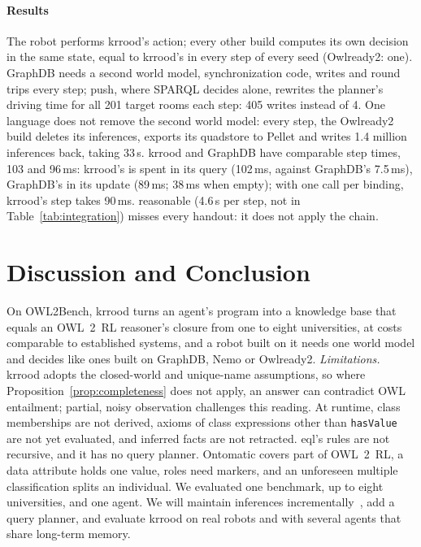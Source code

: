 \documentclass[sigconf,anonymous]{aamas}
\begin{document}
\paragraph{Results}
The robot performs \ac{krrood}'s action; every other build computes its own decision in the same state, equal to \ac{krrood}'s in every step of every seed (Owlready2: one). GraphDB needs a second world model, synchronization code, writes and round trips every step; push, where SPARQL decides alone, rewrites the planner's driving time for all 201 target rooms each step: 405 writes instead of 4. One language does not remove the second world model: every step, the Owlready2 build deletes its inferences, exports its quadstore to Pellet and writes 1.4 million inferences back, taking 33\,s. \ac{krrood} and GraphDB have comparable step times, 103 and 96\,ms: \ac{krrood}'s is spent in its query (102\,ms, against GraphDB's 7.5\,ms), GraphDB's in its update (89\,ms; 38\,ms when empty); with one call per binding, \ac{krrood}'s step takes 90\,ms. reasonable (4.6\,s per step, not in Table~\ref{tab:integration}) misses every handout: it does not apply the chain.

\section{Discussion and Conclusion}
\label{sec:discussion_conclusion}

On OWL2Bench, \ac{krrood} turns an agent's program into a knowledge base that equals an OWL~2~RL reasoner's closure from one to eight universities, at costs comparable to established systems, and a robot built on it needs one world model and decides like ones built on GraphDB, Nemo or Owlready2. \emph{Limitations.} \ac{krrood} adopts the closed-world and unique-name assumptions, so where Proposition~\ref{prop:completeness} does not apply, an answer can contradict OWL entailment; partial, noisy observation challenges this reading. At runtime, class memberships are not derived, axioms of class expressions other than \texttt{hasValue} are not yet evaluated, and inferred facts are not retracted. \ac{eql}'s rules are not recursive, and it has no query planner. Ontomatic covers part of OWL~2~RL, a data attribute holds one value, roles need markers, and an unforeseen multiple classification splits an individual. We evaluated one benchmark, up to eight universities, and one agent. We will maintain inferences incrementally~\cite{MotikNenovPiroHorrocks2015}, add a query planner, and evaluate \ac{krrood} on real robots and with several agents that share long-term memory.

\balance


\end{document}
